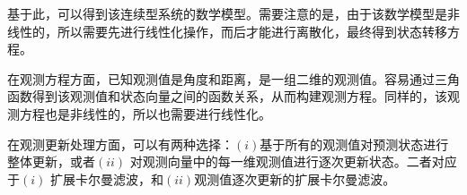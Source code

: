 \documentclass[12pt, onecolumn]{article}
\newcommand\normf{\fangsong}
\begin{document}
	基于此，可以得到该连续型系统的数学模型。需要注意的是，由于该数学模型是非线性的，所以需要先进行线性化操作，而后才能进行离散化，最终得到状态转移方程。
	
	在观测方程方面，已知观测值是角度和距离，是一组二维的观测值。容易通过三角函数得到该观测值和状态向量之间的函数关系，从而构建观测方程。同样的，该观测方程也是非线性的，所以也需要进行线性化。
	
	在观测更新处理方面，可以有两种选择：$(i)$基于所有的观测值对预测状态进行整体更新，或者$(ii)$ 对观测向量中的每一维观测值进行逐次更新状态。二者对应于$(i)$ 扩展卡尔曼滤波，和$(ii)$观测值逐次更新的扩展卡尔曼滤波。
	
	\section{\normf{滤波模型}}
	
\end{document}
